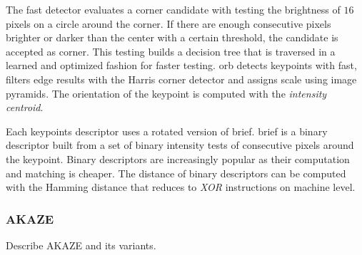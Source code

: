 The \acrshort{fast} detector evaluates a corner candidate with testing the brightness of $16$ pixels on a circle around the corner.
If there are enough consecutive pixels brighter or darker than the center with a certain threshold, the candidate is accepted as corner.
This testing builds a decision tree that is traversed in a learned and optimized fashion for faster testing.
\acrshort{orb} detects keypoints with \acrshort{fast}, filters edge results with the Harris corner detector\cite{harris_1988} and assigns scale using image pyramids.
The orientation of the keypoint is computed with the \emph{intensity centroid}\cite{rosin_cviu99}.

Each keypoints descriptor uses a rotated version of \acrshort{brief}.
\acrshort{brief} is a binary descriptor built from a set of binary intensity tests of consecutive pixels around the keypoint.
Binary descriptors are increasingly popular as their computation and matching is cheaper.
The distance of binary descriptors can be computed with the Hamming distance that reduces to \emph{XOR} instructions on machine level.

\subsubsection{AKAZE}

Describe AKAZE and its variants.
